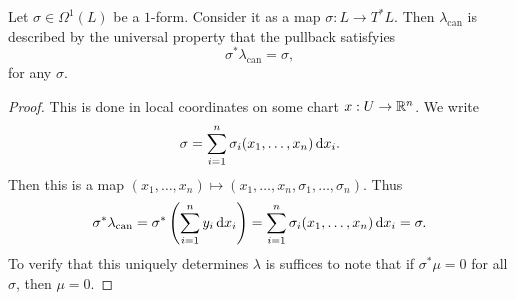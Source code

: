 \begin{prop}
    Let $\sigma\in\Omega^1(L)$ be a $1$-form.
    Consider it as a map $\sigma:L\to T^*L$.
    Then $\lambda_{\mathrm{can}}$ is described by the universal property that the pullback satisfyies
    \[\sigma^*\lambda_{\mathrm{can}}=\sigma,\]
    for any $\sigma$.
\end{prop}

\begin{proof}
    This is done in local coordinates on some chart $x:U\to\mathbb{R}^n$.
    We write
    \[\sigma=\sum_{i=1}^n\sigma_i(x_1,\ldots,x_n)\,\mathrm d x_i.\]
    Then this is a map $(x_1,\ldots,x_n)\mapsto(x_1,\ldots,x_n,\sigma_1,\ldots,\sigma_n)$.
    Thus
    \[\sigma^*\lambda_{\mathrm{can}}=\sigma^*\left(\sum_{i=1}^ny_i\,\mathrm d x_i\right)=\sum_{i=1}^n\sigma_i(x_1,\ldots,x_n)\,\mathrm d x_i=\sigma.\]
    To verify that this uniquely determines $\lambda$ is suffices to note that if $\sigma^*\mu=0$ for all $\sigma$, then $\mu=0$.
\end{proof}